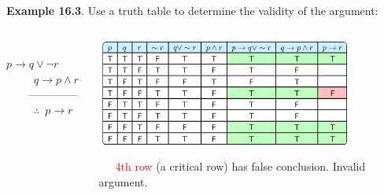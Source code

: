 \documentclass[aspectratio=169]{beamer}
\providecommand{\Red}[1]{\textcolor{red}{#1}}
\newcommand\thfore{\mathord{\therefore}\,}
\begin{document}
\begin{frame}[plain]{}

 {\bf Example 16.3}. Use a truth table to determine the validity of the argument:\\
   \medskip
   
    \begin{columns}[t] %
        \begin{column}[c]{2.5cm}
          \ \ \ \ \  $p \rightarrow q\vee \neg r$\\
         \ \ \ \ \  $q \rightarrow p\wedge r$\\
         \ \ \ \  --------------\\
         \ \ \ \ \    $\thfore$ $p\rightarrow r$  
         
        \end{column}\pause 
       \begin{column}[c]{8cm} %
       
        \begin{center}
          \includegraphics[height=3.5cm]{./img/lecture16-fig2.png}
        \end{center}
             \ \ \   \Red{4th row} (a critical row) has false conclusion. Invalid argument.
        \end{column}
  \end{columns}  
 
\end{frame}
\end{document}
